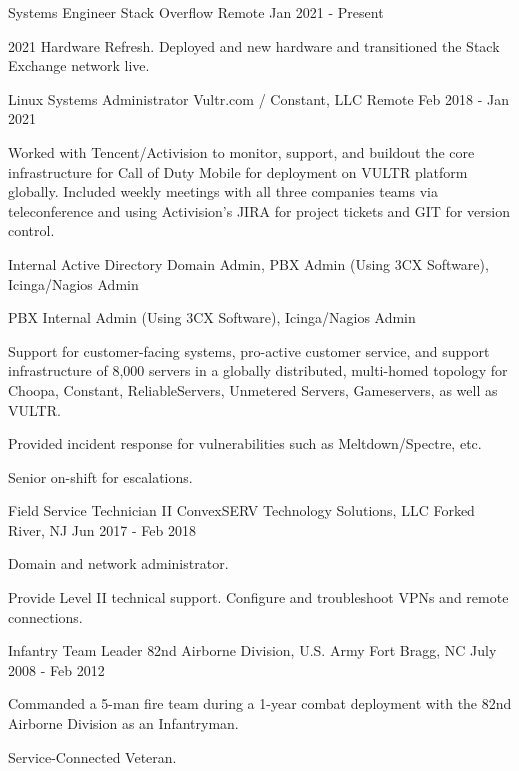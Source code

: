 
\begin{cventries}

	\cventry
	{Systems Engineer}
	{Stack Overflow}
	{Remote}
	{Jan 2021 - Present}
	{
		\begin{cvitems}
		\item {2021 Hardware Refresh. Deployed and new hardware and transitioned the Stack Exchange network live.}
		\end{cvitems}
	}


	\cventry
	{Linux Systems Administrator}
	{Vultr.com / Constant, LLC}
	{Remote}
	{Feb 2018 - Jan 2021}
	{
		\begin{cvitems}
		\item {Worked with Tencent/Activision to monitor, support, and buildout the core infrastructure for Call of Duty Mobile for deployment on VULTR platform globally. Included weekly meetings with all three companies teams via teleconference and using Activision's JIRA for project tickets and GIT for version control.}
		\item {Internal Active Directory Domain Admin, PBX Admin (Using 3CX Software), Icinga/Nagios Admin }
		\item {PBX Internal Admin (Using 3CX Software), Icinga/Nagios Admin }
		\item {Support for customer-facing systems, pro-active customer service, and support infrastructure of 8,000 servers in a globally distributed, multi-homed topology for Choopa, Constant, ReliableServers, Unmetered Servers, Gameservers, as well as VULTR.}
		\item {Provided incident response for vulnerabilities such as Meltdown/Spectre, etc.}
		\item {Senior on-shift for escalations.}
		\end{cvitems}
	}


	\cventry
	{Field Service Technician II}
	{ConvexSERV Technology Solutions, LLC}
	{Forked River, NJ}
	{Jun 2017 - Feb 2018}
	{
		\begin{cvitems}
		\item {Domain and network administrator.}
		\item {Provide Level II technical support. Configure and troubleshoot VPNs and remote connections.}
		\end{cvitems}
	}


	\cventry
	{Infantry Team Leader}
	{82nd Airborne Division, U.S. Army}
	{Fort Bragg, NC}
	{July 2008 - Feb 2012}
	{
		\begin{cvitems}
		\item {Commanded a 5-man fire team during a 1-year combat deployment with the 82nd Airborne Division as an Infantryman.}
		\item {Service-Connected Veteran.}
		\end{cvitems}
	}

\end{cventries}
